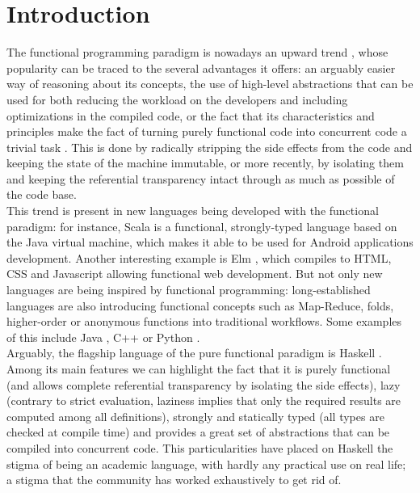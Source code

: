 \section{Introduction}

The functional programming paradigm is nowadays an upward trend
\cite{ford-2013-ibm}, whose popularity can be traced to the several advantages
it offers: an arguably easier way of reasoning about its concepts, the use of
high-level abstractions that can be used for both reducing the workload on the
developers and including optimizations in the compiled code, or the fact that
its characteristics and principles make the fact of turning purely functional
code into concurrent code a trivial task \cite{hammond-2012-parallel}. This is
done by radically stripping the side effects from the code and keeping the
state of the machine immutable, or more recently, by isolating them and keeping
the referential transparency intact through as much as possible of the code base.\\

This trend is present in new languages being developed with the functional
paradigm: for instance, Scala \cite{scala} is a functional, strongly-typed
language based on the Java virtual machine, which makes it able to be used for
Android applications development. Another interesting example is Elm
\cite{elm}, which compiles to HTML, CSS and Javascript allowing functional web
development. But not only new languages are being inspired by functional
programming: long-established languages are also introducing functional
concepts such as Map-Reduce, folds, higher-order or anonymous functions into
traditional workflows. Some examples of this include Java \cite{java8},
C++ \cite{cpp-lambdas, cpp-high-level} or Python \cite{python-mrs}.\\

Arguably, the flagship language of the pure functional paradigm is Haskell
\cite{haskell-98}. Among its main features we can highlight the fact that it is
purely functional (and allows complete referential transparency by isolating
the side effects), lazy (contrary to strict evaluation, laziness implies that
only the required results are computed among all definitions), strongly and
statically typed (all types are checked at compile time) and provides a great
set of abstractions that can be compiled into concurrent code. This
particularities have placed on Haskell the stigma of being an academic
language, with hardly any practical use on real life; a stigma that the
community has worked exhaustively to get rid of.\\

